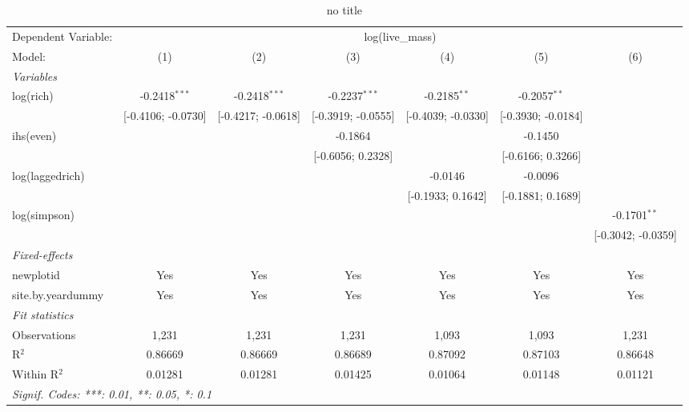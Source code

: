 
\begin{table}[htbp]
   \caption{no title}
   \centering
   \begin{tabular}{lcccccc}
      \tabularnewline \midrule \midrule
      Dependent Variable: & \multicolumn{6}{c}{log(live\_mass)}\\
      Model:            & (1)                & (2)                & (3)                & (4)                & (5)                & (6)\\  
      \midrule
      \emph{Variables}\\
      log(rich)         & -0.2418$^{***}$    & -0.2418$^{***}$    & -0.2237$^{***}$    & -0.2185$^{**}$     & -0.2057$^{**}$     &   \\   
                        & [-0.4106; -0.0730] & [-0.4217; -0.0618] & [-0.3919; -0.0555] & [-0.4039; -0.0330] & [-0.3930; -0.0184] &   \\   
      ihs(even)         &                    &                    & -0.1864            &                    & -0.1450            &   \\   
                        &                    &                    & [-0.6056; 0.2328]  &                    & [-0.6166; 0.3266]  &   \\   
      log(laggedrich)   &                    &                    &                    & -0.0146            & -0.0096            &   \\   
                        &                    &                    &                    & [-0.1933; 0.1642]  & [-0.1881; 0.1689]  &   \\   
      log(simpson)      &                    &                    &                    &                    &                    & -0.1701$^{**}$\\   
                        &                    &                    &                    &                    &                    & [-0.3042; -0.0359]\\   
      \midrule
      \emph{Fixed-effects}\\
      newplotid         & Yes                & Yes                & Yes                & Yes                & Yes                & Yes\\  
      site.by.yeardummy & Yes                & Yes                & Yes                & Yes                & Yes                & Yes\\  
      \midrule
      \emph{Fit statistics}\\
      Observations      & 1,231              & 1,231              & 1,231              & 1,093              & 1,093              & 1,231\\  
      R$^2$             & 0.86669            & 0.86669            & 0.86689            & 0.87092            & 0.87103            & 0.86648\\  
      Within R$^2$      & 0.01281            & 0.01281            & 0.01425            & 0.01064            & 0.01148            & 0.01121\\  
      \midrule \midrule
      \multicolumn{7}{l}{\emph{Signif. Codes: ***: 0.01, **: 0.05, *: 0.1}}\\
   \end{tabular}
\end{table}


